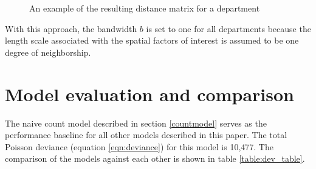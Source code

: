 \documentclass{svjour3}
\begin{document}
  \begin{figure}[!htb]
       \begin{center}
      \end{center}
      \caption{An example of the resulting distance matrix for a department}
     \label{fig:sep_example}
  \end{figure}
  
  
  With this approach, the bandwidth $b$ is set to one for all departments because the length scale associated with the spatial factors of interest is assumed to be one degree of neighborship. 
 
 
 \section{Model evaluation and comparison}
 The naive count model described in section \ref{countmodel} serves as the performance baseline for all other models described in this paper. The total Poisson deviance (equation \ref{eqn:deviance}) for this model is 10,477. The comparison of the models against each other is shown in table \ref{table:dev_table}. 
\end{document}
